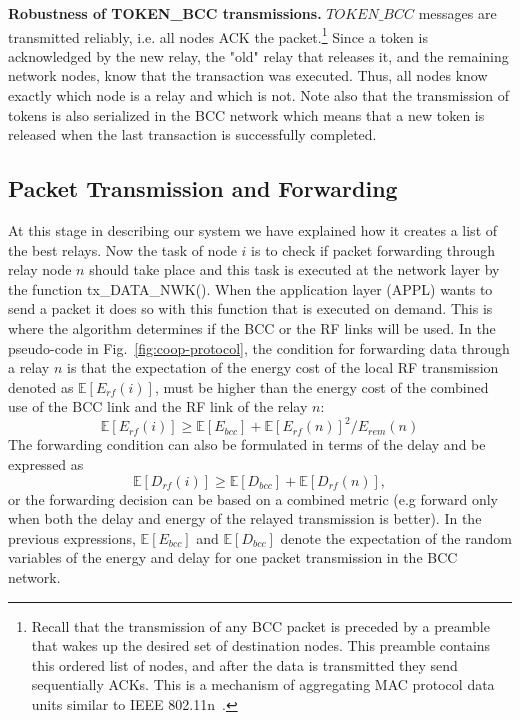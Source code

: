 \documentclass[10pt]{IEEEtran}
\newcounter{section:outage-analysis}
\begin{document}
\textbf{Robustness of TOKEN\_BCC transmissions.}
\label{subsection:4}
$TOKEN\_BCC$ messages are transmitted reliably, i.e. all nodes ACK the packet.\footnote{Recall that the transmission of any BCC packet is preceded by a preamble that wakes up the desired set of destination nodes. This preamble contains this ordered list of nodes, and after the data is transmitted they send sequentially ACKs. This is a mechanism of aggregating MAC protocol data units similar to IEEE 802.11n~\cite{IEEE-80211n}.} Since a token is acknowledged by the new relay, the "old" relay that releases it, and the remaining network nodes, know that the transaction was executed. Thus, all nodes know exactly which node is a relay and which is not. Note also that the transmission of tokens is also serialized in the BCC network which means that a new token is released when the last transaction is successfully completed.

\subsection{Packet Transmission and Forwarding}
\label{subsection:4}
At this stage in describing our system we have explained how it creates a list of the best relays. Now the task of node $i$ is to check if packet forwarding through relay node $n$ should take place and this task is executed at the network layer by the function tx\_DATA\_NWK(). When the application layer (APPL) wants to send a packet it does so with this function that is executed on demand. This is where the algorithm determines if the BCC or the RF links will be used. In the pseudo-code in Fig.~\ref{fig:coop-protocol}, the condition for forwarding data through a relay $n$ is that the expectation of the energy cost of the local RF transmission denoted as $\mathbb{E}[E_{rf}(i)]$, must be higher than the energy cost of the combined use of the BCC link and the RF link of the relay $n$:
\begin{equation}\label{eq:rf_bcc_energy_comparison}
\mathbb{E}[E_{rf}(i)] \geq \mathbb{E}[E_{bcc}]+ \mathbb{E}[E_{rf}(n)]^2/E_{rem}(n)
\end{equation}
The forwarding condition can also be formulated in terms of the delay and be expressed as
\begin{equation}\label{eq:rf_bcc_comparison}
\mathbb{E}[D_{rf}(i)] \geq \mathbb{E}[D_{bcc}]+\mathbb{E}[D_{rf}(n)],
\end{equation}
or the forwarding decision can be based on a combined metric (e.g forward only when both the delay and energy of the relayed transmission is better). In the previous expressions, $\mathbb{E}[E_{bcc}]$ and $\mathbb{E}[D_{bcc}]$ denote the expectation of the random variables of the energy and delay for one packet transmission in the BCC network.
\end{document}
